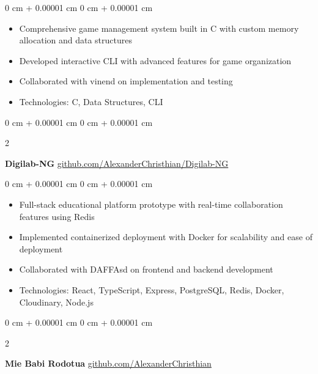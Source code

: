 \documentclass[10pt, letterpaper]{article}
\newenvironment{highlights}{
    \begin{itemize}[
        topsep=0.10 cm,
        parsep=0.10 cm,
        partopsep=0pt,
        itemsep=0pt,
        leftmargin=0 cm + 10pt
    ]
}{
    \end{itemize}
} %
\newenvironment{onecolentry}{
    \begin{adjustwidth}{
        0 cm + 0.00001 cm
    }{
        0 cm + 0.00001 cm
    }
}{
    \end{adjustwidth}
} %
\newenvironment{twocolentry}[2][]{
    \onecolentry
    \def\secondColumn{#2}
    \setcolumnwidth{\fill, 4.5 cm}
    \begin{paracol}{2}
}{
    \switchcolumn \raggedleft \secondColumn
    \end{paracol}
    \endonecolentry
} %
\begin{document}
        \vspace{0.10 cm}
        \begin{onecolentry}
            \begin{highlights}
                \item Comprehensive game management system built in C with custom memory allocation and data structures
                \item Developed interactive CLI with advanced features for game organization
                \item Collaborated with vinend on implementation and testing
                \item Technologies: C, Data Structures, CLI
            \end{highlights}
        \end{onecolentry}


        \vspace{0.2 cm}

        \begin{twocolentry}{
            \href{https://github.com/AlexanderChristhian/Digilab-NG}{github.com/AlexanderChristhian/Digilab-NG}
        }
            \textbf{Digilab-NG}\end{twocolentry}

        \vspace{0.10 cm}
        \begin{onecolentry}
            \begin{highlights}
                \item Full-stack educational platform prototype with real-time collaboration features using Redis
                \item Implemented containerized deployment with Docker for scalability and ease of deployment
                \item Collaborated with DAFFAsd on frontend and backend development
                \item Technologies: React, TypeScript, Express, PostgreSQL, Redis, Docker, Cloudinary, Node.js
            \end{highlights}
        \end{onecolentry}


        \vspace{0.2 cm}

        \begin{twocolentry}{
            \href{https://github.com/AlexanderChristhian/CS9-SBD-AlexanderChristhian}{github.com/AlexanderChristhian}
        }
            \textbf{Mie Babi Rodotua}\end{twocolentry}
\end{document}
